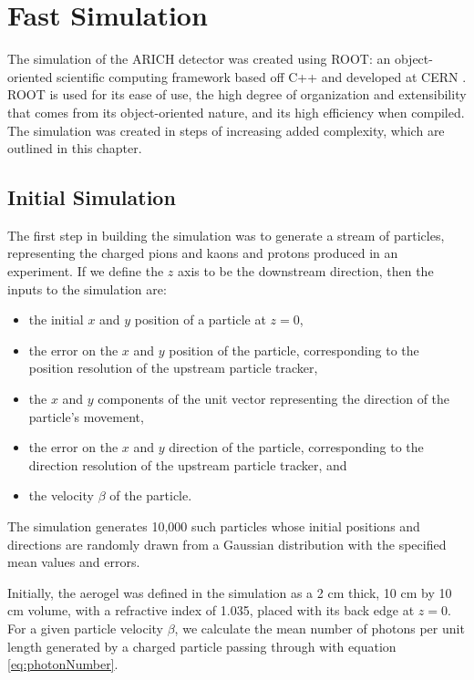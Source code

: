 
\chapter{Fast Simulation}
\label{ch:Methods}
The simulation of the ARICH detector was created using \textsc{ROOT}: an object-oriented scientific computing framework based off C++ and developed at CERN \cite{root}.
\textsc{ROOT} is used for its ease of use, the high degree of organization and extensibility that comes from its object-oriented nature, and its high efficiency when compiled.
The simulation was created in steps of increasing added complexity, which are outlined in this chapter.


\section{Initial Simulation}
\label{sec:experiment}
The first step in building the simulation was to generate a stream of particles, representing the charged pions and kaons and protons produced in an experiment.
If we define the $z$ axis to be the downstream direction, then the inputs to the simulation are:
\begin{itemize}
\item the initial $x$ and $y$ position of a particle at $z=0$,
\item the error on the $x$ and $y$ position of the particle, corresponding to the position resolution of the upstream particle tracker,
\item the $x$ and $y$ components of the unit vector representing the direction of the particle's movement,
\item the error on the $x$ and $y$ direction of the particle, corresponding to the direction resolution of the upstream particle tracker, and
\item the velocity $\beta$ of the particle.
\end{itemize} 
The simulation generates 10,000 such particles whose initial positions and directions are randomly drawn from a Gaussian distribution with the specified mean values and errors. 

Initially, the aerogel was defined in the simulation as a 2 cm thick, 10 cm by 10 cm volume, with a refractive index of 1.035, placed with its back edge at $z=0$.
For a given particle velocity $\beta$, we calculate the mean number of photons per unit length generated by a charged particle passing through with equation \ref{eq:photonNumber}.


